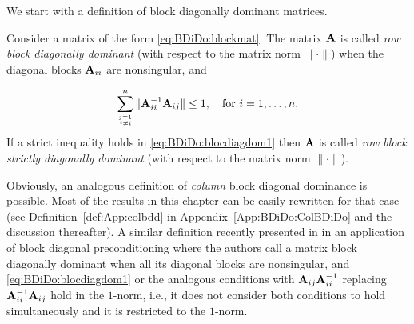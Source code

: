 We start with a definition of block diagonally dominant matrices.

\begin{definition}\label{def:BDiDo:bdd}
Consider a matrix of the form \eqref{eq:BDiDo:blockmat}.
%
%
The matrix $\mathbf{A}$ is called \emph{row block diagonally dominant} (with respect to
the matrix norm $\|\cdot\|$) when the diagonal blocks $\mathbf{A}_{ii}$ are nonsingular,
and

\begin{equation}\label{eq:BDiDo:blocdiagdom1}
\sum_{\atopfrac{j=1}{j\neq i}}^{n}\|\A_{ii}^{-1}\A_{ij}\|\leq 1,\quad\text{for $i=1,\dots,n$.}
\end{equation}
If a strict inequality holds in \eqref{eq:BDiDo:blocdiagdom1}
then $\mathbf{A}$ is called \emph{row block strictly diagonally dominant}
(with respect to the matrix norm $\|\cdot\|$).
\end{definition}

Obviously, an analogous definition of \emph{column} block diagonal dominance is
possible. Most of the results in this chapter can be easily rewritten for that
case (see Definition~\ref{def:App:colbdd} in Appendix~\ref{App:BDiDo:ColBDiDo}
and the discussion thereafter). A similar definition recently presented in
\cite{BenEvaHamLupSla17} in an application of block diagonal preconditioning
where the authors call a matrix block diagonally dominant when all its diagonal
blocks are nonsingular, and \eqref{eq:BDiDo:blocdiagdom1} or the analogous
conditions with $\mathbf{A}_{ij}\mathbf{A}_{ii}^{-1}$ replacing $\mathbf{A}_{ii}^{-1}\mathbf{A}_{ij}$ hold
in the $1$-norm, i.e., it does not consider both conditions to hold
simultaneously and it is restricted to the $1$-norm.

